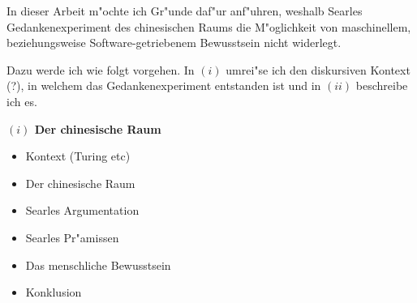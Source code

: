 \documentclass[a4paper, emulatestandardclasses, 12pt]{scrartcl}
\begin{document}
\begin{onehalfspace} 

%


\noindent In dieser Arbeit m"ochte ich Gr"unde daf"ur anf"uhren, weshalb Searles Gedankenexperiment des chinesischen Raums die M"oglichkeit von maschinellem, beziehungsweise Software-getriebenem Bewusstsein nicht widerlegt.

Dazu werde ich wie folgt vorgehen. In $(i)$ umrei"se ich den diskursiven Kontext (?), in welchem das Gedankenexperiment entstanden ist und in $(ii)$ beschreibe ich es. %
\vspace{5mm}

\noindent\textbf{$(i)$ Der chinesische Raum}

\begin{itemize}
  \item Kontext (Turing etc)
  \item Der chinesische Raum
  \item Searles Argumentation
  \item Searles Pr"amissen
  \item Das menschliche Bewusstsein
  \item Konklusion
\end{itemize}



\vspace{3mm}




\end{onehalfspace}


\end{document}
